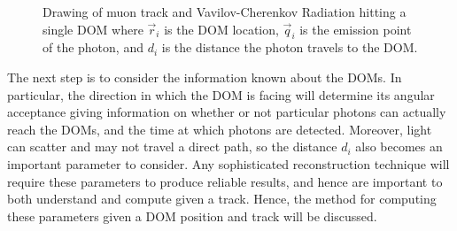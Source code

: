 \begin{figure}
  \centering
  \caption{Drawing of muon track and Vavilov-Cherenkov Radiation hitting a single DOM where $\vec{r}_{i}$ is the DOM location, $\vec{q}_{i}$ is the emission point of the photon, and $d_{i}$ is the distance the photon travels to the DOM.}
  \label{fig:ghit}
\end{figure}

The next step is to consider the information known about the DOMs. In particular, the direction in which the DOM is facing will determine its angular acceptance giving information on whether or not particular photons can actually reach the DOMs, and the time at which photons are detected. Moreover, light can scatter and may not travel a direct path, so the distance $d_{i}$ also becomes an important parameter to consider. Any sophisticated reconstruction technique will require these parameters to produce reliable results, and hence are important to both understand and compute given a track. Hence, the method for computing these parameters given a DOM position and track will be discussed.

